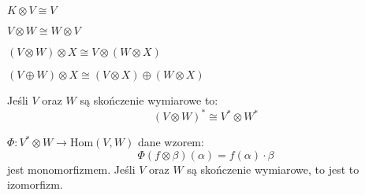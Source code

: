 \begin{corollary} $ K \otimes V \cong V $ \end{corollary}
\begin{corollary} $ V \otimes W \cong W \otimes V $ \end{corollary}
\begin{corollary} $ (V \otimes W) \otimes X \cong V \otimes (W \otimes X) $ \end{corollary}
\begin{corollary} $ (V \oplus W) \otimes X \cong (V \otimes X) \oplus (W \otimes X) $ \end{corollary}
\begin{corollary}
Jeśli $V$ oraz $W$ są skończenie wymiarowe to:
\[ (V \otimes W)^* \cong V^* \otimes W^* \]
\end{corollary}

\begin{statement}
    $\Phi : V^* \otimes W \to \text{Hom}(V, W)$ dane wzorem:
    \[ \Phi(f \otimes \beta)(\alpha) = f(\alpha) \cdot \beta \]
    jest monomorfizmem. Jeśli $V$ oraz $W$ są skończenie wymiarowe, to jest to izomorfizm.
\end{statement}